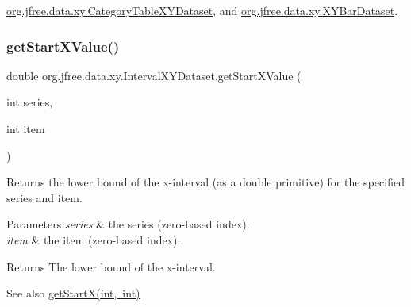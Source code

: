 \mbox{\hyperlink{classorg_1_1jfree_1_1data_1_1xy_1_1_category_table_x_y_dataset_ad3ea675c3e162845c8055b7411003e0a}{org.\+jfree.\+data.\+xy.\+Category\+Table\+X\+Y\+Dataset}}, and \mbox{\hyperlink{classorg_1_1jfree_1_1data_1_1xy_1_1_x_y_bar_dataset_a6d95616ddb06550818a901791ce17ec2}{org.\+jfree.\+data.\+xy.\+X\+Y\+Bar\+Dataset}}.

\mbox{\label{interfaceorg_1_1jfree_1_1data_1_1xy_1_1_interval_x_y_dataset_a437afe7f637a8d16ad305023a7819eef}} 
\subsubsection{\texorpdfstring{get\+Start\+X\+Value()}{getStartXValue()}}
{\footnotesize\ttfamily double org.\+jfree.\+data.\+xy.\+Interval\+X\+Y\+Dataset.\+get\+Start\+X\+Value (\begin{DoxyParamCaption}\item[{int}]{series,  }\item[{int}]{item }\end{DoxyParamCaption})}

Returns the lower bound of the x-\/interval (as a double primitive) for the specified series and item.


\begin{DoxyParams}{Parameters}
{\em series} & the series (zero-\/based index). \\
\hline
{\em item} & the item (zero-\/based index).\\
\hline
\end{DoxyParams}
\begin{DoxyReturn}{Returns}
The lower bound of the x-\/interval.
\end{DoxyReturn}
\begin{DoxySeeAlso}{See also}
\mbox{\hyperlink{interfaceorg_1_1jfree_1_1data_1_1xy_1_1_interval_x_y_dataset_a7548ec7d60d72463313dc6f10aceee62}{get\+Start\+X(int, int)}} 
\end{DoxySeeAlso}


